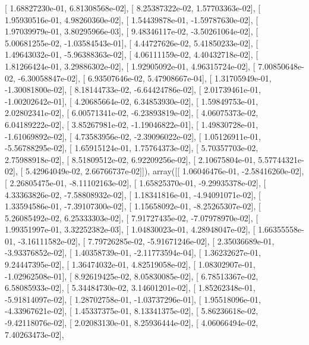 \documentclass{article}
\begin{document}
       [  1.68827230e-01,   6.81308568e-02],
       [  8.25387322e-02,   1.57703363e-02],
       [  1.95930516e-01,   4.98260360e-02],
       [  1.54439878e-01,  -1.59787630e-02],
       [  1.97039979e-01,   3.80295966e-03],
       [  9.48346117e-02,  -3.50261064e-02],
       [  5.00681255e-02,  -1.03584543e-01],
       [  4.44727626e-02,   5.41850233e-02],
       [  1.49643032e-01,  -5.96388363e-02],
       [  4.06111159e-02,   4.40432718e-02],
       [  1.81266424e-01,   3.29886302e-02],
       [  1.92905092e-01,   4.96315724e-02],
       [  7.00850648e-02,  -6.30058847e-02],
       [  6.93507646e-02,   5.47908667e-04],
       [  1.31705949e-01,  -1.30081800e-02],
       [  8.18144733e-02,  -6.64424786e-02],
       [  2.01739461e-01,  -1.00202642e-01],
       [  4.20685664e-02,   6.34853930e-02],
       [  1.59849753e-01,   2.02802341e-02],
       [  6.00571341e-02,  -6.23893819e-02],
       [  4.06075373e-02,   6.04189222e-02],
       [  3.85267981e-02,  -1.19046822e-01],
       [  1.49830728e-01,  -1.61069892e-02],
       [  4.73583956e-02,  -2.39096022e-02],
       [  1.05126911e-01,  -5.56788295e-02],
       [  1.65915124e-01,   1.75764373e-02],
       [  5.70357703e-02,   2.75988918e-02],
       [  8.51809512e-02,   6.92209256e-02],
       [  2.10675804e-01,   5.57744321e-02],
       [  5.42964049e-02,   2.66766737e-02]]), array([[  1.06046476e-01,  -2.58416260e-02],
       [  2.26805475e-01,  -8.11102163e-02],
       [  1.65825370e-01,  -9.29935378e-02],
       [  4.33363826e-02,  -7.58808932e-02],
       [  1.18341816e-01,  -4.94091071e-02],
       [  1.33594586e-01,  -7.39107300e-02],
       [  1.15658092e-01,  -8.25265307e-02],
       [  5.26085492e-02,   6.25333303e-02],
       [  7.91727435e-02,  -7.07978970e-02],
       [  1.99351997e-01,   3.32252382e-03],
       [  1.04830023e-01,   4.28948047e-02],
       [  1.66355558e-01,  -3.16111582e-02],
       [  7.79726285e-02,  -5.91671246e-02],
       [  2.35036689e-01,  -3.93376852e-02],
       [  1.40358739e-01,  -2.11773594e-04],
       [  1.36232627e-01,   9.24447395e-02],
       [  1.36474032e-01,   4.82519058e-02],
       [  1.08302907e-01,  -1.02962508e-01],
       [  8.92619425e-02,   8.05830085e-02],
       [  6.78513367e-02,   6.58085933e-02],
       [  5.34484730e-02,   3.14601201e-02],
       [  1.85262348e-01,  -5.91814097e-02],
       [  1.28702758e-01,  -1.03737296e-01],
       [  1.95518096e-01,  -4.33967621e-02],
       [  1.45337375e-01,   8.13341375e-02],
       [  5.86236618e-02,  -9.42118076e-02],
       [  2.02083130e-01,   8.25936444e-02],
       [  4.06066494e-02,   7.40263473e-02],
\end{document}

